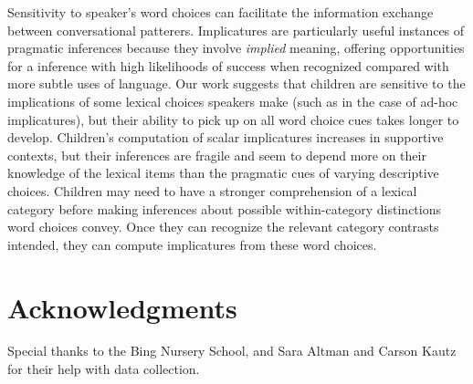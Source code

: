 \documentclass[10pt,letterpaper]{article}
\begin{document}



Sensitivity to speaker's word choices can facilitate the information exchange between conversational patterers. Implicatures are particularly useful instances of pragmatic inferences because they involve \emph{implied} meaning, offering opportunities for a inference with high likelihoods of success when recognized compared with more subtle uses of language. Our work suggests that children are sensitive to the implications of some lexical choices speakers make (such as in the case of ad-hoc implicatures), but their ability to pick up on all word choice cues takes longer to develop.  Children's computation of scalar implicatures increases in supportive contexts, but their inferences are fragile and seem to depend more on their knowledge of the lexical items than the pragmatic cues of varying descriptive choices. Children may need to have a stronger comprehension of a lexical category before making inferences about possible within-category distinctions word choices convey.  Once they can recognize the relevant category contrasts intended, they can compute implicatures from these word choices. 

\section{Acknowledgments}

Special thanks to the Bing Nursery School, and Sara Altman and Carson Kautz for their help with data collection. 



\setlength{\bibleftmargin}{.125in} \setlength{\bibindent}{-\bibleftmargin}


\end{document}

